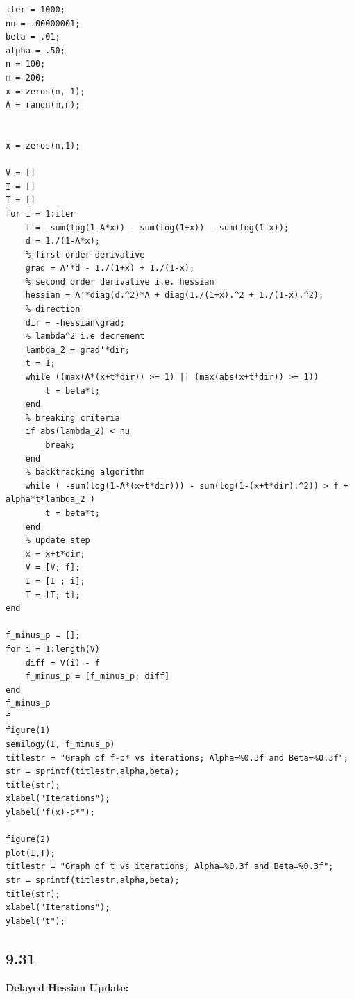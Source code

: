 \documentclass[12pt]{article}
\begin{document}
\begin{lstlisting}
iter = 1000;
nu = .00000001;
beta = .01;
alpha = .50;
n = 100;
m = 200;
x = zeros(n, 1);
A = randn(m,n);


x = zeros(n,1);

V = []
I = []
T = []
for i = 1:iter
    f = -sum(log(1-A*x)) - sum(log(1+x)) - sum(log(1-x));
    d = 1./(1-A*x);
    % first order derivative
    grad = A'*d - 1./(1+x) + 1./(1-x);
    % second order derivative i.e. hessian
    hessian = A'*diag(d.^2)*A + diag(1./(1+x).^2 + 1./(1-x).^2);
    % direction
    dir = -hessian\grad;
    % lambda^2 i.e decrement
    lambda_2 = grad'*dir;
    t = 1; 
    while ((max(A*(x+t*dir)) >= 1) || (max(abs(x+t*dir)) >= 1))
        t = beta*t;
    end
    % breaking criteria
    if abs(lambda_2) < nu
        break;
    end
    % backtracking algorithm
    while ( -sum(log(1-A*(x+t*dir))) - sum(log(1-(x+t*dir).^2)) > f + alpha*t*lambda_2 )
        t = beta*t;
    end
    % update step
    x = x+t*dir;
    V = [V; f];
    I = [I ; i];
    T = [T; t];
end

f_minus_p = [];
for i = 1:length(V)
    diff = V(i) - f
    f_minus_p = [f_minus_p; diff]
end
f_minus_p
f
figure(1)
semilogy(I, f_minus_p)
titlestr = "Graph of f-p* vs iterations; Alpha=%0.3f and Beta=%0.3f";
str = sprintf(titlestr,alpha,beta);
title(str);
xlabel("Iterations");
ylabel("f(x)-p*");

figure(2)
plot(I,T);
titlestr = "Graph of t vs iterations; Alpha=%0.3f and Beta=%0.3f";
str = sprintf(titlestr,alpha,beta);
title(str);
xlabel("Iterations");
ylabel("t");
\end{lstlisting}

\subsection*{9.31}
\textbf{Delayed Hessian Update:}\\
\end{document}
